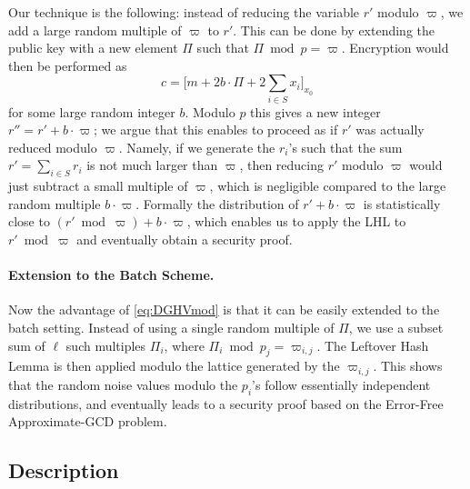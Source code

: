 \documentclass{llncs}
\begin{document}
Our technique is the following: instead of reducing the variable $r'$
modulo $\varpi$, we add a large random multiple of $\varpi$ to $r'$. This
can be done by extending the public key with a new element $\varPi$ such
that $\varPi \bmod p=\varpi$. Encryption would then be performed as
\begin{equation}
\label{eq:DGHVmod}
c = \Big[m + 2b \cdot \varPi+
  2\sum\limits_{i\in S} x_i\Big]_{x_0}
\end{equation}
for some large random integer $b$. Modulo $p$ this gives a new integer
$r''=r' + b \cdot \varpi$; we argue that this enables to proceed as if
$r'$ was actually reduced modulo $\varpi$. Namely, if we generate the
$r_i$'s such that the sum $r'=\sum_{i \in S} r_i$ is not much larger than
$\varpi$, then reducing $r'$ modulo $\varpi$ would just subtract a
small multiple of $\varpi$, which is negligible compared to the large
random multiple $b \cdot \varpi$. Formally  the distribution of $r' + b
\cdot \varpi$ is statistically close to $(r' \bmod \varpi) + b \cdot
\varpi$, which enables us to apply the LHL to $r' \bmod \varpi$ and
eventually obtain a security proof.

\paragraph{Extension to the Batch Scheme.} Now the advantage of \eqref{eq:DGHVmod} is that it can be easily extended
to the batch setting. Instead of using a single random multiple of
$\varPi$, we use a subset sum of $\ell$ such multiples $\varPi_i$, where
$\varPi_i \bmod p_j=\varpi_{i,j}$. The Leftover Hash Lemma is then
applied modulo the lattice generated by the $\varpi_{i,j}$. This shows
that the random noise values modulo the $p_i$'s follow essentially
independent distributions, and eventually leads to a security proof based on the Error-Free Approximate-GCD problem. 

\subsection{Description}\label{subsec:description}
\end{document}
